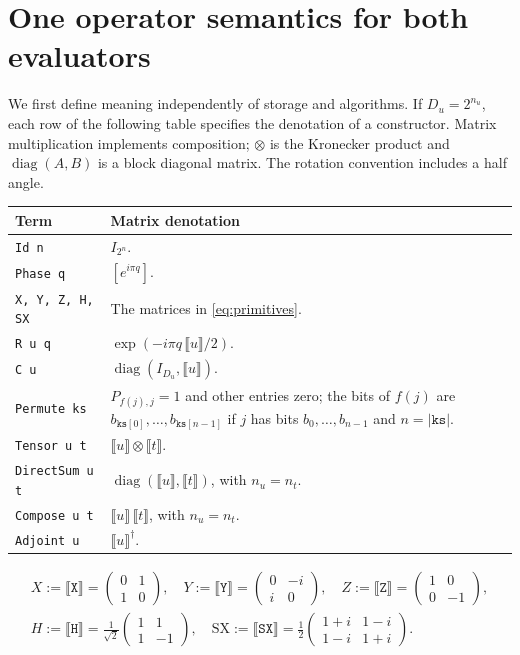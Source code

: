 \documentclass[11pt,a4paper]{article}
\newcommand{\sem}[1]{\llbracket #1\rrbracket}
\newcommand{\code}[1]{\texttt{#1}}
\DeclareMathOperator{\diag}{diag}
\begin{document}
\section{One operator semantics for both evaluators}
\label{sec:matrix}
We first define meaning independently of storage and algorithms.
If $D_u=2^{n_u}$, each row of the following table specifies the denotation
of a constructor. Matrix multiplication implements composition;
$\otimes$ is the Kronecker product and $\diag(A,B)$ is a block diagonal
matrix. The rotation convention includes a half angle.
\begin{center}
\small
\begin{tabularx}{\linewidth}{@{}lY@{}}
\toprule
Term & Matrix denotation\\
\midrule
\code{Id n} & $I_{2^n}$.\\
\code{Phase q} & $[e^{i\pi q}]$.\\
\code{X, Y, Z, H, SX} & The matrices in \eqref{eq:primitives}.\\
\code{R u q} & $\exp(-i\pi q\,\sem u/2)$.\\
\code{C u} & $\diag(I_{D_u},\sem u)$.\\
\code{Permute ks} & $P_{f(j),j}=1$ and other entries zero; the bits of
 $f(j)$ are $b_{\code{ks}[0]},\ldots,b_{\code{ks}[n-1]}$ if $j$ has
 bits $b_0,\ldots,b_{n-1}$ and $n=|\code{ks}|$.\\
\code{Tensor u t} & $\sem u\otimes\sem t$.\\
\code{DirectSum u t} & $\diag(\sem u,\sem t)$, with $n_u=n_t$.\\
\code{Compose u t} & $\sem u\,\sem t$, with $n_u=n_t$.\\
\code{Adjoint u} & $\sem u^\dagger$.\\
\bottomrule
\end{tabularx}
\end{center}
\begin{equation}
\begin{gathered}
X:=\sem{\code X}=\begin{pmatrix}0&1\\1&0\end{pmatrix},\quad
Y:=\sem{\code Y}=\begin{pmatrix}0&-i\\i&0\end{pmatrix},\quad
Z:=\sem{\code Z}=\begin{pmatrix}1&0\\0&-1\end{pmatrix},\\
H:=\sem{\code H}=\frac1{\sqrt2}\begin{pmatrix}1&1\\1&-1\end{pmatrix},\quad
\mathrm{SX}:=\sem{\code{SX}}=\frac12
\begin{pmatrix}1+i&1-i\\1-i&1+i\end{pmatrix}.
\end{gathered}
\label{eq:primitives}
\end{equation}
\end{document}
